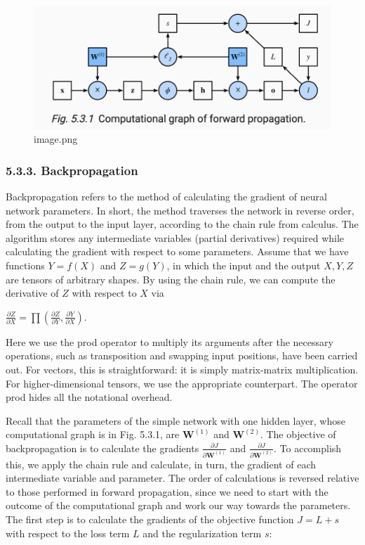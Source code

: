 \documentclass[11pt]{article}
\begin{document}
\begin{figure}
\centering
\includegraphics[keepaspectratio]{main_files/image.png}
\caption{image.png}
\end{figure}

    \subsubsection*{5.3.3. Backpropagation}\label{backpropagation}

    Backpropagation refers to the method of calculating the gradient of
neural network parameters. In short, the method traverses the network in
reverse order, from the output to the input layer, according to the
chain rule from calculus. The algorithm stores any intermediate
variables (partial derivatives) required while calculating the gradient
with respect to some parameters. Assume that we have functions
\(Y = f(X)\) and \(Z = g(Y)\), in which the input and the output
\(X, Y, Z\) are tensors of arbitrary shapes. By using the chain rule, we
can compute the derivative of \(Z\) with respect to \(X\) via

\(\frac{\partial Z}{\partial X} = \prod \left( \frac{\partial Z}{\partial Y}, \frac{\partial Y}{\partial X} \right)\).

Here we use the prod operator to multiply its arguments after the
necessary operations, such as transposition and swapping input
positions, have been carried out. For vectors, this is straightforward:
it is simply matrix-matrix multiplication. For higher-dimensional
tensors, we use the appropriate counterpart. The operator prod hides all
the notational overhead.

Recall that the parameters of the simple network with one hidden layer,
whose computational graph is in Fig. 5.3.1, are \(\mathbf{W}^{(1)}\) and
\(\mathbf{W}^{(2)}\). The objective of backpropagation is to calculate
the gradients \(\frac{\partial J}{\partial \mathbf{W}^{(1)}}\) and
\(\frac{\partial J}{\partial \mathbf{W}^{(2)}}\). To accomplish this, we
apply the chain rule and calculate, in turn, the gradient of each
intermediate variable and parameter. The order of calculations is
reversed relative to those performed in forward propagation, since we
need to start with the outcome of the computational graph and work our
way towards the parameters. The first step is to calculate the gradients
of the objective function \(J = L + s\) with respect to the loss term
\(L\) and the regularization term \(s\):
\end{document}
